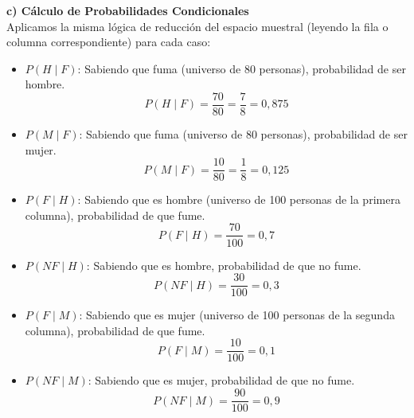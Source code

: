 \documentclass[11pt,a4paper]{article}
\begin{document}
\vspace{0.3cm}
\noindent \textbf{c) Cálculo de Probabilidades Condicionales} \\
Aplicamos la misma lógica de reducción del espacio muestral (leyendo la fila o columna correspondiente) para cada caso:

\begin{itemize}
    \item $P(H \mid F)$: Sabiendo que fuma (universo de 80 personas), probabilidad de ser hombre.
    $$ P(H \mid F) = \frac{70}{80} = \frac{7}{8} = 0,875 $$

    \item $P(M \mid F)$: Sabiendo que fuma (universo de 80 personas), probabilidad de ser mujer.
    $$ P(M \mid F) = \frac{10}{80} = \frac{1}{8} = 0,125 $$

    \item $P(F \mid H)$: Sabiendo que es hombre (universo de 100 personas de la primera columna), probabilidad de que fume.
    $$ P(F \mid H) = \frac{70}{100} = 0,7 $$

    \item $P(NF \mid H)$: Sabiendo que es hombre, probabilidad de que no fume.
    $$ P(NF \mid H) = \frac{30}{100} = 0,3 $$

    \item $P(F \mid M)$: Sabiendo que es mujer (universo de 100 personas de la segunda columna), probabilidad de que fume.
    $$ P(F \mid M) = \frac{10}{100} = 0,1 $$

    \item $P(NF \mid M)$: Sabiendo que es mujer, probabilidad de que no fume.
    $$ P(NF \mid M) = \frac{90}{100} = 0,9 $$
\end{itemize}
\end{document}
